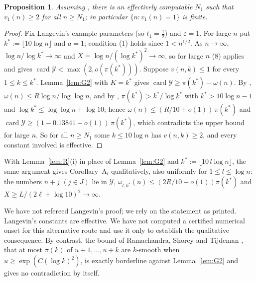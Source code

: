 \documentclass[10pt]{article}
\numberwithin{equation}{section}
\newtheorem{proposition}[theorem]{Proposition}
\theoremstyle{definition}
\theoremstyle{plain}
\newcommand{\cY}{\mathcal{Y}}
\newcommand{\eps}{\varepsilon}
\begin{document}
\begin{proposition}\label{prop:langevin}
Assuming \cite[Corollaire~1, (8)]{La81}, there is an effectively computable $N_1$ such that $v_1(n)\ge2$ for all
$n\ge N_1$; in particular $\{n:v_1(n)=1\}$ is finite.
\end{proposition}

\begin{proof}
Fix Langevin's example parameters (so $t_1=\frac12$) and $\eps=1$. For large $n$ put $k^*:=\lfloor10\log n\rfloor$
and $a=1$; condition (1) holds since $1<n^{1/2}$. As $n\to\infty$, $\log n/\log k^*\to\infty$ and
$X=\log n/(\log k^*)^2\to\infty$, so for large $n$ (8) applies and gives
$\operatorname{card}\cY<\max(2,o(\pi(k^*)))$. Suppose $v(n,k)\le1$ for every $1\le k\le k^*$. Lemma~\ref{lem:G2}
with $K=k^*$ gives $\operatorname{card}\cY\ge\pi(k^*)-\omega(n)$. By \cite{Ro83}, $\omega(n)\le R\log n/\log\log n$,
and by \cite{RS62}, $\pi(k^*)>k^*/\log k^*$ with $k^*>10\log n-1$ and $\log k^*\le\log\log n+\log10$; hence
$\omega(n)\le(R/10+o(1))\,\pi(k^*)$ and $\operatorname{card}\cY\ge(1-0.13841-o(1))\,\pi(k^*)$, which contradicts the
upper bound for large $n$. So for all $n\ge N_1$ some $k\le10\log n$ has $v(n,k)\ge2$, and every constant involved
is effective.
\end{proof}

With Lemma~\ref{lem:R}(i) in place of Lemma~\ref{lem:G2} and $k^*:=\lfloor10\,l\log n\rfloor$, the same argument
gives Corollary~A$_l$ qualitatively, also uniformly for $1\le l\le\log n$: the numbers $n+j$ $(j\in J)$ lie in
$\cY$, $\omega_{l,k^*}(n)\le(2R/10+o(1))\pi(k^*)$ and $X\ge L/(2\ell+\log10)^2\to\infty$.

We have not refereed Langevin's proof; we rely on the statement as printed. Langevin's constants are effective. We have not computed a certified numerical onset for this alternative
route and use it only to establish the qualitative consequence.
By contrast, the bound of Ramachandra, Shorey and Tijdeman \cite[Theorem~2]{RST76}, that at most $\pi(k)$ of
$u+1,\dots,u+k$ are $k$-smooth when $u\ge\exp(C(\log k)^2)$, is exactly borderline against Lemma~\ref{lem:G2} and
gives no contradiction by itself.
\end{document}
